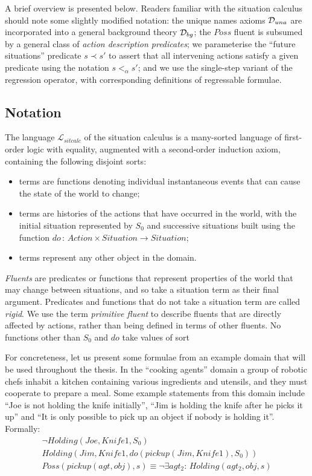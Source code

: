 A brief overview is presented below. Readers familiar with the situation
calculus should note some slightly modified notation: the unique names
axioms $\mathcal{D}_{una}$ are incorporated into a general background theory
$\mathcal{D}_{bg}$; the $Poss$ fluent is subsumed by a general class of
\emph{action description predicates}; we parameterise the {}``future
situations'' predicate $s\prec s'$ to assert that all intervening
actions satisfy a given predicate using the notation $s<_{\alpha}s'$;
and we use the single-step variant of the regression operator, with
corresponding definitions of regressable formulae.


\subsection{Notation\label{sec:Background:SC:Notation}}

The language $\mathcal{L}_{sitcalc}$ of the situation calculus is
a many-sorted language of first-order logic with equality, augmented
with a second-order induction axiom, containing the following disjoint
sorts:

\begin{itemize}
\item \emph{} terms are functions denoting individual instantaneous
events that can cause the state of the world to change; 
\item {} terms are histories of the actions that have occurred
in the world, with the initial situation represented by $S_{0}$ and
successive situations built using the function $do\,:\, Action\times Situation\rightarrow Situation$; 
\item {} terms represent any other object in the domain. 
\end{itemize}
\emph{Fluents} are predicates or functions that represent properties
of the world that may change between situations, and so take a situation
term as their final argument. Predicates and functions that do not
take a situation term are called \emph{rigid}. We use the term \emph{primitive
fluent} to describe fluents that are directly affected by actions,
rather than being defined in terms of other fluents. No functions
other than $S_{0}$ and $do$ take values of sort \medskip{}


For concreteness, let us present some formulae from an example domain
that will be used throughout the thesis. In the {}``cooking agents''
domain a group of robotic chefs inhabit a kitchen containing various
ingredients and utensils, and they must cooperate to prepare a meal.
Some example statements from this domain include {}``Joe is not holding
the knife initially'', {}``Jim is holding the knife after he picks
it up'' and {}``It is only possible to pick up an object if nobody
is holding it''. Formally:\begin{gather*}
\neg Holding(Joe,Knife1,S_{0})\\
Holding(Jim,Knife1,do(pickup(Jim,Knife1),S_{0}))\\
Poss(pickup(agt,obj),s)\equiv\neg\exists agt_{2}:\, Holding(agt_{2},obj,s)\end{gather*}


